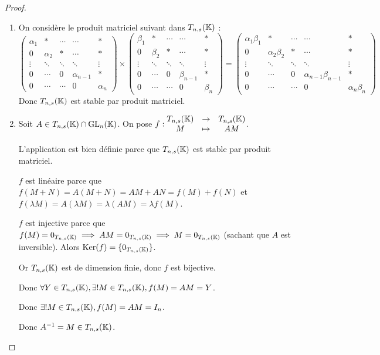 \documentclass[12pt,a4paper]{report}
\begin{document}
\begin{proof}
    \begin{enumerate}
        \item On considère le produit matriciel suivant dans $T_{n,s}(\mathbb{K})$ :
        $$\left(\begin{matrix}\alpha_1 & * & \cdots & \cdots & * \\ 0 & \alpha_2 & * & \cdots & * \\ \vdots & \ddots & \ddots & \ddots & \vdots \\ 0 & \cdots & 0 & \alpha_{n-1} & * \\ 0 & \cdots & \cdots & 0 & \alpha_n\end{matrix}\right) \times \left(\begin{matrix}\beta_1 & * & \cdots & \cdots & * \\ 0 & \beta_2 & * & \cdots & * \\ \vdots & \ddots & \ddots & \ddots & \vdots \\ 0 & \cdots & 0 & \beta_{n-1} & * \\ 0 & \cdots & \cdots & 0 & \beta_n\end{matrix}\right) = \left(\begin{matrix}\alpha_1 \beta_1 & * & \cdots & \cdots & * \\ 0 & \alpha_2 \beta_2 & * & \cdots & * \\ \vdots & \ddots & \ddots & \ddots & \vdots \\ 0 & \cdots & 0 & \alpha_{n-1} \beta_{n-1} & * \\ 0 & \cdots & \cdots & 0 & \alpha_n \beta_n\end{matrix}\right)$$
        Donc $T_{n,s}(\mathbb{K})$ est stable par produit matriciel.
        \item Soit $A \in T_{n,s}(\mathbb{K})\cap \mathrm{GL}_n(\mathbb{K})$.
        On pose $f : \begin{matrix} T_{n,s}(\mathbb{K}) &\to &T_{n,s}(\mathbb{K}) \\ M &\mapsto &AM \end{matrix}$.
        
        L'application est bien définie parce que $T_{n,s}(\mathbb{K})$ est stable par produit matriciel.
        
        $f$ est linéaire parce que $f(M+N) = A(M+N) = AM + AN = f(M) + f(N)$ et $f(\lambda M) = A(\lambda M) = \lambda (AM) = \lambda f(M)$.
        
        $f$ est injective parce que $f(M) = 0_{T_{n,s}(\mathbb{K})} \implies AM = 0_{T_{n,s}(\mathbb{K})} \implies M = 0_{T_{n,s}(\mathbb{K})}$ (sachant que $A$ est inversible). Alors $\mathrm{Ker}(f) = \{0_{T_{n,s}(\mathbb{K})}\}$.
        
        Or $T_{n,s}(\mathbb{K})$ est de dimension finie, donc $f$ est bijective.

        Donc $\forall Y \in T_{n,s}(\mathbb{K}), \exists ! M \in T_{n,s}(\mathbb{K}), f(M) = AM = Y$.
        
        Donc $\exists ! M \in T_{n,s}(\mathbb{K}), f(M) = AM = I_n$.
        
        Donc $A^{-1} = M \in T_{n,s}(\mathbb{K})$.
    \end{enumerate}
\end{proof}
\end{document}
